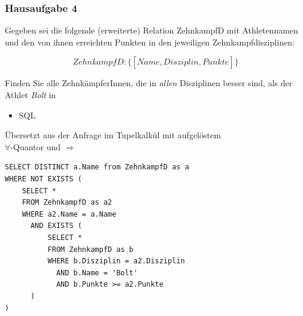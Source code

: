 \begin{frame}[fragile]
	\frametitle{Hausaufgabe 4}
	\vspace{0.5cm}

	\begin{multicols}{2}
		Gegeben sei die folgende (erweiterte) Relation ZehnkampfD mit 
		Athletennamen und den von ihnen erreichten Punkten in den jeweiligen Zehnkampfdisziplinen:

		\[ ZehnkampfD: \{[ \underline{Name, Disziplin}, Punkte ]\} \]

		Finden Sie alle ZehnkämpferInnen, die in \textit{allen} Disziplinen besser sind,
		als der Athlet \textit{Bolt} in
		\begin{itemize}
			\item SQL
		\end{itemize}
		\vfill\columnbreak
		Übersetzt aus der Anfrage im Tupelkalkül mit aufgelöstem \\
		\( \forall \)-Quantor und \( \Rightarrow \)
		\begin{verbatim}
SELECT DISTINCT a.Name from ZehnkampfD as a
WHERE NOT EXISTS (
	SELECT *
	FROM ZehnkampfD as a2
	WHERE a2.Name = a.Name
	  AND EXISTS (
		  SELECT *
		  FROM ZehnkampfD as b
		  WHERE b.Disziplin = a2.Disziplin
		    AND b.Name = 'Bolt'
		    AND b.Punkte >= a2.Punkte
	  )
)
		\end{verbatim}
	\end{multicols}
\end{frame}


